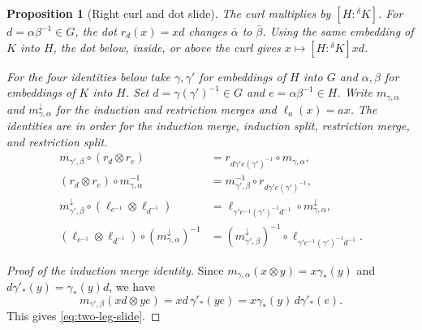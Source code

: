 \documentclass[11pt,a4paper]{article}
\numberwithin{equation}{section}
\newtheorem{proposition}[theorem]{Proposition}
\theoremstyle{definition}
\newcommand{\cg}[2]{{}^{#1}\!#2}
\begin{document}
\begin{proposition}[Right curl and dot slide]\label{prop:curl}
The curl multiplies by \([H:\cg{\delta}{K}]\).
For \(d=\alpha\beta^{-1}\in G\), the dot \(r_d(x)=xd\) changes
\(\bar\alpha\) to \(\bar\beta\). Using the same embedding of \(K\)
into \(H\), the dot below, inside, or above the curl gives
\(x\mapsto[H:\cg{\delta}{K}]xd\).

For the four identities below take \(\gamma,\gamma'\) for embeddings
of \(H\) into \(G\) and \(\alpha,\beta\) for embeddings of \(K\) into \(H\).
Set \(d=\gamma(\gamma')^{-1}\in G\) and \(e=\alpha\beta^{-1}\in H\).
Write \(m_{\gamma,\alpha}\) and \(m^\downarrow_{\gamma,\alpha}\) for the
induction and restriction merges and \(\ell_a(x)=ax\).
The identities are in order for the induction merge, induction split,
restriction merge, and restriction split.
\begin{align}
 m_{\gamma',\beta}\circ(r_d\otimes r_e)
  &=r_{d\gamma'e(\gamma')^{-1}}\circ m_{\gamma,\alpha},
       \label{eq:two-leg-slide}\\
 (r_d\otimes r_e)\circ m_{\gamma,\alpha}^{-1}
  &=m_{\gamma',\beta}^{-1}\circ r_{d\gamma'e(\gamma')^{-1}},\\
 m^\downarrow_{\gamma',\beta}\circ(\ell_{e^{-1}}\otimes\ell_{d^{-1}})
  &=\ell_{\gamma'e^{-1}(\gamma')^{-1}d^{-1}}\circ
        m^\downarrow_{\gamma,\alpha},\\
 (\ell_{e^{-1}}\otimes\ell_{d^{-1}})\circ(m^\downarrow_{\gamma,\alpha})^{-1}
  &=(m^\downarrow_{\gamma',\beta})^{-1}\circ
        \ell_{\gamma'e^{-1}(\gamma')^{-1}d^{-1}} .
\end{align}
\end{proposition}

\begin{proof}[Proof of the induction merge identity]
Since \(m_{\gamma,\alpha}(x\otimes y)=x\gamma_*(y)\) and
\(d\gamma'_*(y)=\gamma_*(y)d\), we have
\[
 m_{\gamma',\beta}(xd\otimes ye)
   =xd\,\gamma'_*(ye)
   =x\gamma_*(y)\,d\gamma'_*(e).
\]
This gives \eqref{eq:two-leg-slide}.
\end{proof}
\end{document}
